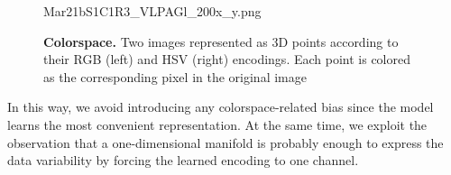 \begin{figure}
    \centering
    \vspace{1.5cm}
    Mar21bS1C1R3\_VLPAGl\_200x\_y.png   
    \caption{\textbf{Colorspace.} Two images represented as 3D points according to their RGB (left) and HSV (right) encodings. 
    Each point is colored as the corresponding pixel in the original image
    }
    \label{fig:dataset:colorspace}
\end{figure}
In this way, we avoid introducing any colorspace-related bias since the model learns the most convenient representation.
At the same time, we exploit the observation that a one-dimensional manifold is probably enough to express the data variability by forcing the learned encoding to one channel.